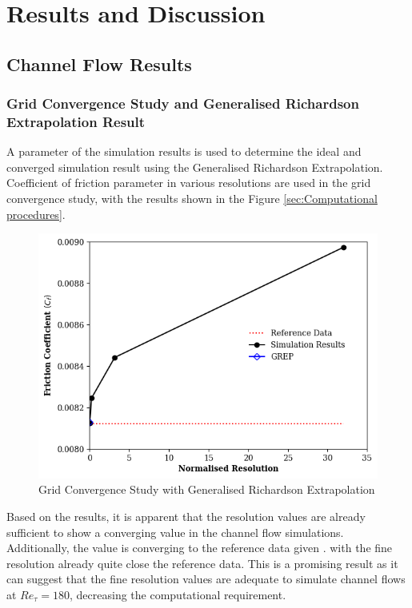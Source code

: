\section{Results and Discussion} 
\label{sec:Results & Discussion}

\subsection{Channel Flow Results}




\subsubsection{Grid Convergence Study and Generalised Richardson Extrapolation Result}
A parameter of the simulation results is used to determine the ideal and converged simulation result using the Generalised Richardson Extrapolation. Coefficient of friction parameter in various resolutions are used in the grid convergence study, with the results shown in the Figure \ref{sec:Computational procedures}.

\begin{figure}[h!]
	\centering
	\label{fig:GREP_res}
	\includegraphics[width=0.75\linewidth]{Figures/GCS_real}
	\caption{Grid Convergence Study with Generalised Richardson Extrapolation}
\end{figure}

Based on the results, it is apparent that the resolution values are already sufficient to show a converging value in the channel flow simulations. Additionally, the value is converging to the reference data given \cite{Lee_Moser_2015}. with the fine resolution already quite close the reference data. This is a promising result as it can suggest that the fine resolution values are adequate to simulate channel flows at $Re_\tau = 180$, decreasing the computational requirement.

